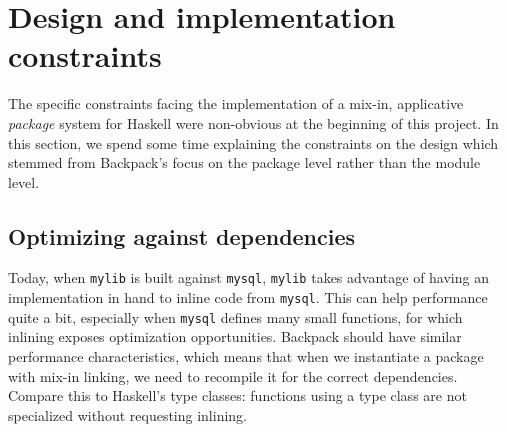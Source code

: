 \section{Design and implementation constraints}


The specific constraints facing the implementation of a mix-in,
applicative \emph{package} system for Haskell were non-obvious at
the beginning of this project.  In this section, we spend some time
explaining the constraints on the design which stemmed from Backpack's
focus on the package level rather than the module level.




\subsection{Optimizing against dependencies}
\label{sec:optimizing}


Today, when \verb|mylib| is built against \verb|mysql|, \verb|mylib|
takes advantage of having an implementation in hand to inline code from
\verb|mysql|.  This can help performance quite a bit, especially when
\verb|mysql| defines many small functions, for which inlining exposes
optimization opportunities.  Backpack should have similar performance
characteristics, which means that when we instantiate a package with
mix-in linking, we need to recompile it for the correct dependencies.
Compare this to Haskell's type classes: functions using a type class are
not specialized without requesting inlining.

